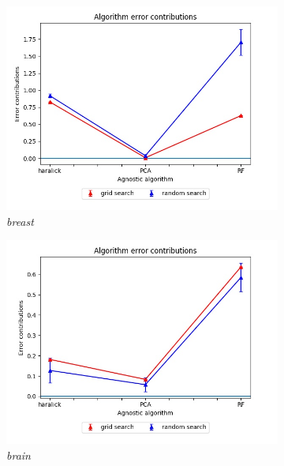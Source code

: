 \begin{figure}[H]
\centering
\begin{subfigure}{.5\textwidth}
  \centering
  \includegraphics[scale=0.37]{img/EP/agnostic_error_alg_breast}
  \caption{\textit{breast}}
  \label{fig:sfig1}
\end{subfigure}%
\begin{subfigure}{.5\textwidth}
  \centering
  \includegraphics[scale=0.37]{img/EP/agnostic_error_alg_brain}
  \caption{\textit{brain}}
  \label{fig:sfig2}
\end{subfigure}
\begin{subfigure}{.5\textwidth}

\end{subfigure}
\end{figure}
